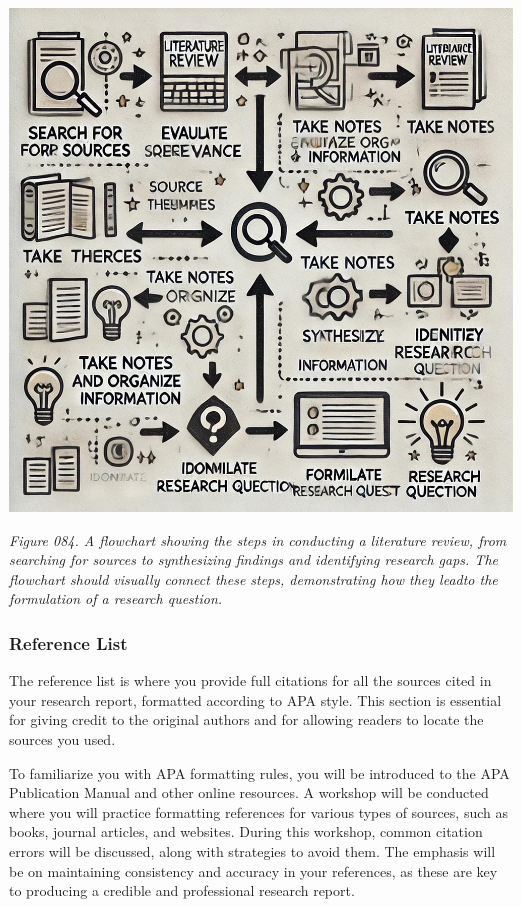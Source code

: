 \documentclass[
]{book}
\begin{document}
\includegraphics[width=1\textwidth,height=\textheight]{images/fig084.jpg}

\emph{Figure 084. A flowchart showing the steps in conducting a literature review, from searching for sources to synthesizing findings and identifying research gaps. The flowchart should visually connect these steps, demonstrating how they leadto the formulation of a research question.}

\subsubsection{Reference List}\label{reference-list}

The reference list is where you provide full citations for all the sources cited in your research report, formatted according to APA style. This section is essential for giving credit to the original authors and for allowing readers to locate the sources you used.

To familiarize you with APA formatting rules, you will be introduced to the APA Publication Manual and other online resources. A workshop will be conducted where you will practice formatting references for various types of sources, such as books, journal articles, and websites. During this workshop, common citation errors will be discussed, along with strategies to avoid them. The emphasis will be on maintaining consistency and accuracy in your references, as these are key to producing a credible and professional research report.
\end{document}
